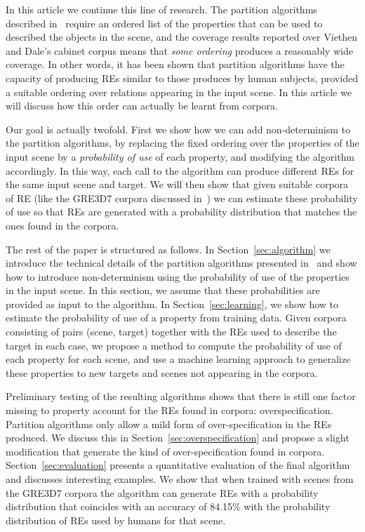 In this article we continue this line of research.  The partition algorithms described in~\cite{arec2:2008:Areces,arec:usin11} require an 
ordered list of the properties that can be used to described the objects in the scene, and the coverage results reported over Viethen and 
Dale's cabinet corpus means that \emph{some ordering} produces a reasonably wide coverage.  In other words, it has been shown that partition algorithms have the capacity of producing REs similar to those produces by human subjects, provided a suitable ordering over relations appearing 
in the input scene. In this article we will discuss how this order can actually be learnt from corpora.  

Our goal is actually twofold. First we show how we can add non-determinism to the partition algorithms, by replacing the fixed ordering 
over the properties of the input scene by a \emph{probability of use} of each property, and modifying the algorithm accordingly.  
In this way, each call to the algorithm can produce different REs for the same input scene and target.  We will then show that given suitable corpora of RE (like the GRE3D7 corpora discussed in~\cite{viet:gene11}) we can estimate these probability of use so that REs are generated with a probability distribution that matches the ones found in the corpora.  

The rest of the paper is structured as follows. In Section~\ref{sec:algorithm} we introduce the technical details of the 
partition algorithms presented in~\cite{arec2:2008:Areces,arec:usin11} and show how to introduce non-determinism using 
the probability of use of the properties in the input scene.  In this section, we assume that these probabilities are provided as 
input to the algorithm. In Section~\ref{sec:learning}, we show how to estimate the 
probability of use of a property from training data. Given corpora consisting of pairs (scene, target) together with the REs used to 
describe the target in each case, we propose a method to compute the probability of use of each property for each scene, and use a machine learning approach to generalize these properties to new targets and scenes not appearing in the corpora. 

Preliminary testing of the resulting algorithms shows that there is still one factor missing to property account for the REs found in corpora: overspecification.  Partition algorithms only allow a mild form of over-specification in the REs produced.  We discuss this in Section~\ref{sec:overspecification} and propose a slight modification that generate the kind of over-specification found in corpora. 
Section~\ref{sec:evaluation} presents a quantitative evaluation of the final algorithm and discusses interesting examples. We show that when trained with scenes from the GRE3D7 corpora the algorithm can generate REs with a probability distribution that coincides with an accuracy of 84.15\% with the probability distribution of REs used by humans for that scene. 

